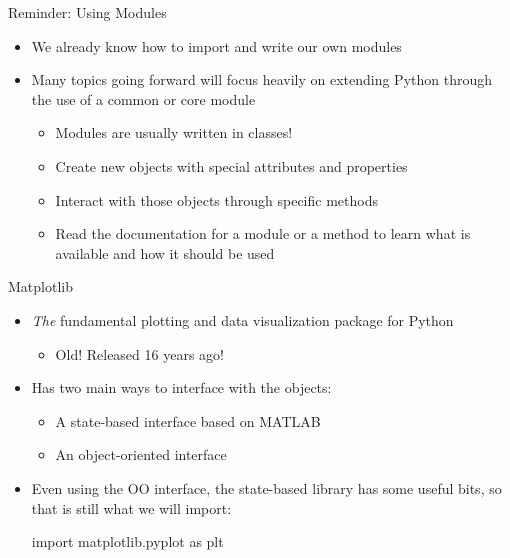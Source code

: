 \documentclass[pdf, aspectratio=169, 12pt]{beamer}
\begin{document}
\begin{frame}{Reminder: Using Modules}
	\begin{itemize}
		\item We already know how to import and write our own modules
		\item Many topics going forward will focus heavily on extending Python through the use of a common or core module
			\begin{itemize}
				\item Modules are usually written in classes!
				\item Create new objects with special attributes and properties
				\item Interact with those objects through specific methods
				\item \alert{Read the documentation} for a module or a method to learn what is available and how it should be used
			\end{itemize}
	\end{itemize}
\end{frame}

\begin{frame}[fragile]{Matplotlib}
	\begin{itemize}
		\item \emph{The} fundamental plotting and data visualization package for Python
			\begin{itemize}
				\item Old! Released 16 years ago!
			\end{itemize}
		\item Has two main ways to interface with the objects:
			\begin{itemize}
				\item A state-based interface based on MATLAB
				\item \alert<2>{An object-oriented interface}
			\end{itemize}
		\item Even using the OO interface, the state-based library has some useful bits, so that is still what we will import:
			\begin{pythoncode}
				import matplotlib.pyplot as plt
			\end{pythoncode}
	\end{itemize}
\end{frame}
\end{document}
